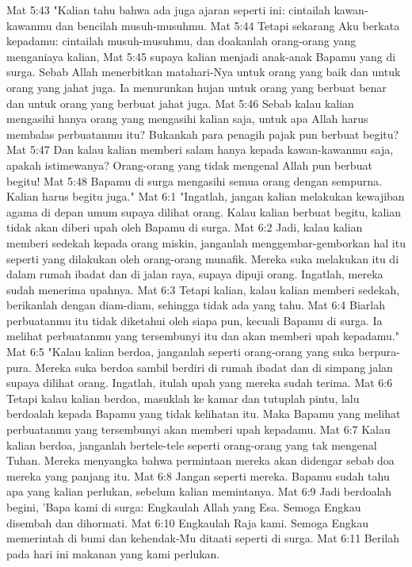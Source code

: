 Mat 5:43  "Kalian tahu bahwa ada juga ajaran seperti ini: cintailah kawan-kawanmu dan bencilah musuh-musuhmu.
Mat 5:44  Tetapi sekarang Aku berkata kepadamu: cintailah musuh-musuhmu, dan doakanlah orang-orang yang menganiaya kalian,
Mat 5:45  supaya kalian menjadi anak-anak Bapamu yang di surga. Sebab Allah menerbitkan matahari-Nya untuk orang yang baik dan untuk orang yang jahat juga. Ia menurunkan hujan untuk orang yang berbuat benar dan untuk orang yang berbuat jahat juga.
Mat 5:46  Sebab kalau kalian mengasihi hanya orang yang mengasihi kalian saja, untuk apa Allah harus membalas perbuatanmu itu? Bukankah para penagih pajak pun berbuat begitu?
Mat 5:47  Dan kalau kalian memberi salam hanya kepada kawan-kawanmu saja, apakah istimewanya? Orang-orang yang tidak mengenal Allah pun berbuat begitu!
Mat 5:48  Bapamu di surga mengasihi semua orang dengan sempurna. Kalian harus begitu juga."
Mat 6:1  "Ingatlah, jangan kalian melakukan kewajiban agama di depan umum supaya dilihat orang. Kalau kalian berbuat begitu, kalian tidak akan diberi upah oleh Bapamu di surga.
Mat 6:2  Jadi, kalau kalian memberi sedekah kepada orang miskin, janganlah menggembar-gemborkan hal itu seperti yang dilakukan oleh orang-orang munafik. Mereka suka melakukan itu di dalam rumah ibadat dan di jalan raya, supaya dipuji orang. Ingatlah, mereka sudah menerima upahnya.
Mat 6:3  Tetapi kalian, kalau kalian memberi sedekah, berikanlah dengan diam-diam, sehingga tidak ada yang tahu.
Mat 6:4  Biarlah perbuatanmu itu tidak diketahui oleh siapa pun, kecuali Bapamu di surga. Ia melihat perbuatanmu yang tersembunyi itu dan akan memberi upah kepadamu."
Mat 6:5  "Kalau kalian berdoa, janganlah seperti orang-orang yang suka berpura-pura. Mereka suka berdoa sambil berdiri di rumah ibadat dan di simpang jalan supaya dilihat orang. Ingatlah, itulah upah yang mereka sudah terima.
Mat 6:6  Tetapi kalau kalian berdoa, masuklah ke kamar dan tutuplah pintu, lalu berdoalah kepada Bapamu yang tidak kelihatan itu. Maka Bapamu yang melihat perbuatanmu yang tersembunyi akan memberi upah kepadamu.
Mat 6:7  Kalau kalian berdoa, janganlah bertele-tele seperti orang-orang yang tak mengenal Tuhan. Mereka menyangka bahwa permintaan mereka akan didengar sebab doa mereka yang panjang itu.
Mat 6:8  Jangan seperti mereka. Bapamu sudah tahu apa yang kalian perlukan, sebelum kalian memintanya.
Mat 6:9  Jadi berdoalah begini, 'Bapa kami di surga: Engkaulah Allah yang Esa. Semoga Engkau disembah dan dihormati.
Mat 6:10  Engkaulah Raja kami. Semoga Engkau memerintah di bumi dan kehendak-Mu ditaati seperti di surga.
Mat 6:11  Berilah pada hari ini makanan yang kami perlukan.
